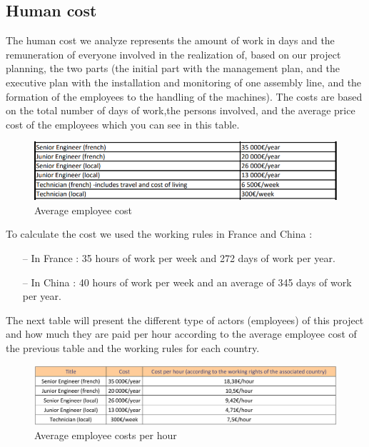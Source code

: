 \subsection{Human cost}
The human cost we analyze represents the amount of work in days and the remuneration of everyone involved in the realization of, based on our project planning, the two parts (the initial part with the management plan, and the executive plan with the installation and monitoring of one assembly line, and the formation of the employees to the handling of the machines).
The costs are based on the total number of days of work,the persons involved, and the average price cost of the employees which you can see in this table.

\begin{figure}[h]

\centering
\includegraphics[scale=1]{Img/humanCost.png}
\caption{Average employee cost}

\end{figure}

To calculate the cost we used the working rules in France and China :
\begin{itemize}
	\item[--] In France : 35 hours of work per week and 272 days of work per year.
	\item[--] In China :  40 hours of work per week and an average of 345 days of work per year. \\
\end{itemize}

The next table will present the different type of actors (employees) of this project and how much they are paid per hour according to the average employee cost of the previous table and the working rules for each country.

\begin{figure}[h]

\centering
\includegraphics[scale=0.6]{Img/HumanCostPerHours.png}
\caption{Average employee costs per hour}

\end{figure}

